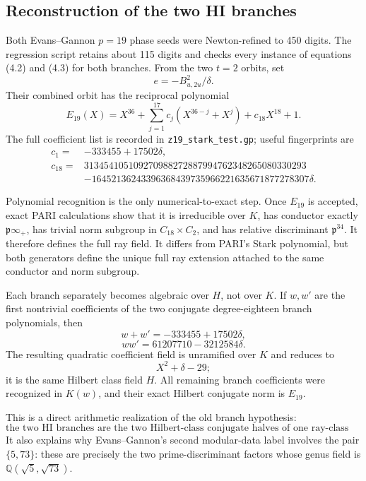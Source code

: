 \documentclass[11pt,reqno]{amsart}
\theoremstyle{plain}
\begin{document}
\subsection{Reconstruction of the two HI branches}\label{sec:26.2}

Both Evans--Gannon \(p=19\) phase seeds were Newton-refined to 450 digits. The regression script retains about 115 digits and checks every instance of equations (4.2) and (4.3) for both branches. From the two \(t=2\) orbits, set
\[
e=-B_{u,2u}^2/\delta.
\]
Their combined orbit has the reciprocal polynomial
\[
E_{19}(X)
=X^{36}+\sum_{j=1}^{17}c_j(X^{36-j}+X^j)+c_{18}X^{18}+1.
\]
The full coefficient list is recorded in \texttt{z19\_\allowbreak stark\_\allowbreak test.gp}; useful fingerprints are
\[
\begin{aligned}
c_1={}&-333455+17502\delta,\\
c_{18}={}&313454105109270988272887994762348265080330293\\
&-16452136243396368439735966221635671877278307\delta.
\end{aligned}
\]

Polynomial recognition is the only numerical-to-exact step. Once \(E_{19}\) is accepted, exact PARI calculations show that it is irreducible over \(K\), has conductor exactly \(\mathfrak p\infty_+\), has trivial norm subgroup in \(C_{18}\times C_2\), and has relative discriminant \(\mathfrak p^{34}\). It therefore defines the full ray field. It differs from PARI's Stark polynomial, but both generators define the unique full ray extension attached to the same conductor and norm subgroup.

Each branch separately becomes algebraic over \(H\), not over \(K\). If \(w,w'\) are the first nontrivial coefficients of the two conjugate degree-eighteen branch polynomials, then
\[
w+w'=-333455+17502\delta,
\]
\[
ww'=61207710-3212584\delta.
\]
The resulting quadratic coefficient field is unramified over \(K\) and reduces to
\[
X^2+\delta-29;
\]
it is the same Hilbert class field \(H\). All remaining branch coefficients were recognized in \(K(w)\), and their exact Hilbert conjugate norm is \(E_{19}\).

This is a direct arithmetic realization of the old branch hypothesis:
\[
\boxed{
\text{the two HI branches are the two Hilbert-class conjugate halves of one ray-class orbit.}
}
\]
It also explains why Evans--Gannon's second modular-data label involves the pair \(\{5,73\}\): these are precisely the two prime-discriminant factors whose genus field is \(\mathbb Q(\sqrt5,\sqrt{73})\).
\end{document}
